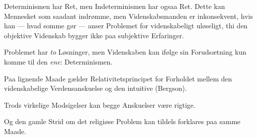 \documentclass[12pt,a4paper]{article}
\begin{document}
Determinismen har Ret, men Indeterminismen har ogsaa Ret. Dette kan
Mennesket som saadant indrømme, men Videnskabsmanden er inkonsekvent,
hvis han --- hvad somme gør --- anser Problemet for videnskabeligt
uløseligt, thi den objektive Videnskab bygger ikke paa subjektive
Erfaringer.

Problemet har \emph{to} Løsninger, men Videnskaben kan ifølge sin
Forudsætning kun komme til den \emph{ene}: Determinismen.

Paa lignende Maade gælder Relativitetsprincipet for Forholdet mellem den
videnskabelige Verdensanskuelse og den intuitive (Bergson).

Trods virkelige Modsigelser kan begge Anskuelser være rigtige.

Og den gamle Strid om det religiøse Problem kan tildels forklares paa
samme Maade.
\end{document}
